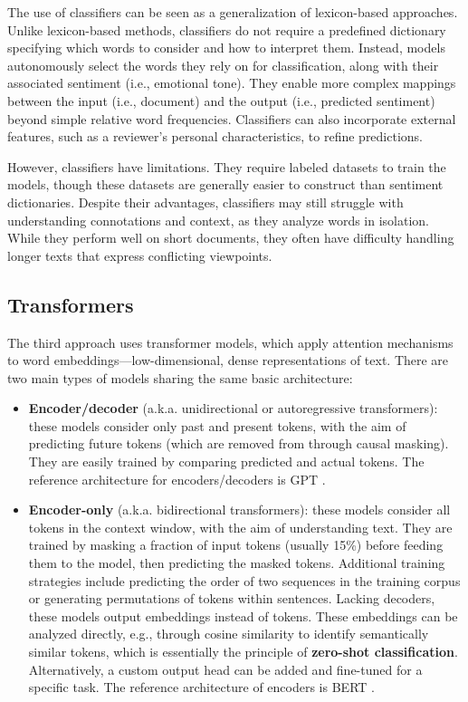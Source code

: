 \documentclass{article}
\begin{document}
The use of classifiers can be seen as a generalization of lexicon-based approaches. Unlike lexicon-based methods, classifiers do not require a predefined dictionary specifying which words to consider and how to interpret them. Instead, models autonomously select the words they rely on for classification, along with their associated sentiment (i.e., emotional tone). They enable more complex mappings between the input (i.e., document) and the output (i.e., predicted sentiment) beyond simple relative word frequencies. Classifiers can also incorporate external features, such as a reviewer’s personal characteristics, to refine predictions.

However, classifiers have limitations. They require labeled datasets to train the models, though these datasets are generally easier to construct than sentiment dictionaries. Despite their advantages, classifiers may still struggle with understanding connotations and context, as they analyze words in isolation. While they perform well on short documents, they often have difficulty handling longer texts that express conflicting viewpoints.

\subsection{Transformers}

The third approach uses transformer models, which apply attention mechanisms to word embeddings—low-dimensional, dense representations of text. There are two main types of models sharing the same basic architecture:
\begin{itemize}
    \item \textbf{Encoder/decoder} (a.k.a. unidirectional or autoregressive transformers): these models consider only past and present tokens, with the aim of predicting future tokens (which are removed from through causal masking). They are easily trained by comparing predicted and actual tokens. The reference architecture for encoders/decoders is GPT \citep{radford_improving_2018,radford_language_2019}.
    \item \textbf{Encoder-only} (a.k.a. bidirectional transformers): these models consider all tokens in the context window, with the aim of understanding text. They are trained by masking a fraction of input tokens (usually 15\%) before feeding them to the model, then predicting the masked tokens. Additional training strategies include predicting the order of two sequences in the training corpus or generating permutations of tokens within sentences. Lacking decoders, these models output embeddings instead of tokens. These embeddings can be analyzed directly, e.g., through cosine similarity to identify semantically similar tokens, which is essentially the principle of \textbf{zero-shot classification}. Alternatively, a custom output head can be added and fine-tuned for a specific task. The reference architecture of encoders is BERT \citep{devlin_bert_2019}.
\end{itemize}
\end{document}
